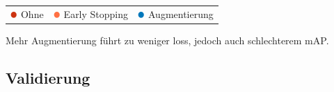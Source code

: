 \begin{table}[htb]
  \centering
  \begin{tabular}{m{}<{\centering}m{}<{\centering}m{}<{\centering}}
    $\color[HTML]{CC3311}\medbullet$  Ohne & $\color[HTML]{FF7043}\medbullet$  Early Stopping & $\color[HTML]{0077BB}\medbullet$  Augmentierung
  \end{tabular}    
\end{table}

Mehr Augmentierung führt zu weniger loss, 
jedoch auch schlechterem mAP.





\subsection{Validierung}

